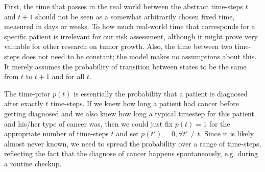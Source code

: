 \documentclass[\relativeRoot/main.tex]{subfiles}
\begin{document}
First, the time that passes in the real world between the abstract time-steps $t$ and $t+1$ should not be seen as a somewhat arbitrarily chosen fixed time, measured in days or weeks. To how much real-world time that corresponds for a specific patient is irrelevant for our risk assessment, although it might prove very valuable for other research on tumor growth. Also, the time between two time-steps does not need to be constant; the model makes no assumptions about this. It merely assumes the probability of transition between states to be the same from $t$ to $t+1$ and for all $t$.

The time-prior $p(t)$ is essentially the probability that a patient is diagnosed after exactly $t$ time-steps. If we knew how long a patient had cancer before getting diagnosed and we also knew how long a typical timestep for this patient and his/her type of cancer was, then we could just fix $p(t)=1$ for the appropriate number of time-steps $t$ and set $p(t') = 0, \forall t' \neq t$. Since it is likely almost never known, we need to spread the probability over a range of time-steps, reflecting the fact that the diagnose of cancer happens spontaneously, e.g. during a routine checkup.
\end{document}
